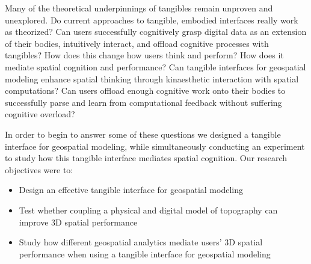 \documentclass[prodmode,acmtochi]{acmsmall} %
\begin{document}

Many of the theoretical underpinnings of tangibles 
remain unproven and unexplored. 
Do current approaches to tangible, embodied interfaces
really work as theorized? 
Can users successfully
cognitively grasp digital data as an extension of their bodies,
intuitively interact, 
and offload cognitive processes
with tangibles?
How does this change how users think and perform?
How does it mediate spatial cognition and performance? 
Can tangible interfaces for geospatial modeling 
enhance spatial thinking
through kinaesthetic interaction with 
spatial computations?
Can users offload enough cognitive work onto their bodies
to successfully parse and learn from computational feedback
without suffering cognitive overload?

In order to begin to answer some of these questions we 
designed a tangible interface for geospatial modeling, 
while simultaneously conducting an experiment
to study how this tangible interface mediates spatial cognition.
%
Our research objectives were to:
%
\begin{itemize}
\item Design an effective tangible interface for geospatial modeling
\item Test whether coupling a physical and digital model of topography can improve 3D spatial performance
\item Study how different geospatial analytics mediate users' 3D spatial performance when using a tangible interface for geospatial modeling
\end{itemize}
\end{document}
